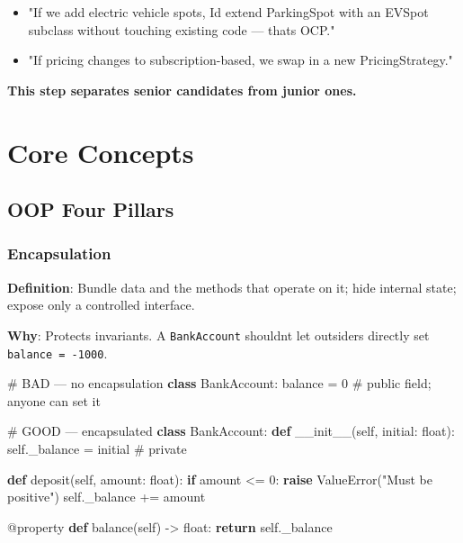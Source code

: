 \documentclass[11pt]{article}
\providecommand{\tightlist}{\setlength{\itemsep}{1pt}\setlength{\parskip}{0pt}}
\newenvironment{Shaded}{\begin{snugshade}}{\end{snugshade}}
\newcommand{\AttributeTok}[1]{\textcolor[rgb]{0.16,0.50,0.73}{#1}}
\newcommand{\BuiltInTok}[1]{\textcolor[rgb]{0.50,0.55,0.55}{#1}}
\newcommand{\CommentTok}[1]{\textcolor[rgb]{0.48,0.49,0.49}{#1}}
\newcommand{\ControlFlowTok}[1]{\textcolor[rgb]{0.99,0.74,0.29}{\textbf{#1}}}
\newcommand{\DecValTok}[1]{\textcolor[rgb]{0.96,0.45,0.00}{#1}}
\newcommand{\FunctionTok}[1]{\textcolor[rgb]{0.56,0.27,0.68}{#1}}
\newcommand{\KeywordTok}[1]{\textcolor[rgb]{0.81,0.81,0.76}{\textbf{#1}}}
\newcommand{\NormalTok}[1]{\textcolor[rgb]{0.81,0.81,0.76}{#1}}
\newcommand{\OperatorTok}[1]{\textcolor[rgb]{0.81,0.81,0.76}{#1}}
\newcommand{\PreprocessorTok}[1]{\textcolor[rgb]{0.15,0.68,0.38}{#1}}
\newcommand{\StringTok}[1]{\textcolor[rgb]{0.96,0.31,0.31}{#1}}
\newcommand{\VariableTok}[1]{\textcolor[rgb]{0.15,0.68,0.68}{#1}}
\begin{document}
\begin{itemize}
\tightlist
\item
  "If we add electric vehicle spots, I\textquotesingle d extend ParkingSpot with an EVSpot subclass without touching existing code --- that\textquotesingle s OCP."
\item
  "If pricing changes to subscription-based, we swap in a new PricingStrategy."
\end{itemize}

\textbf{This step separates senior candidates from junior ones.}

\section{Core Concepts}\label{core-concepts}

\subsection{OOP Four Pillars}\label{oop-four-pillars}

\subsubsection{Encapsulation}\label{encapsulation}

\textbf{Definition}: Bundle data and the methods that operate on it; hide internal state; expose only a controlled interface.

\textbf{Why}: Protects invariants. A \texttt{BankAccount} shouldn\textquotesingle t let outsiders directly set \texttt{balance\ =\ -1000}.


\begin{Shaded}
\begin{Highlighting}[]
\CommentTok{\# BAD — no encapsulation}
\KeywordTok{class}\NormalTok{ BankAccount:}
\NormalTok{    balance }\OperatorTok{=} \DecValTok{0}  \CommentTok{\# public field; anyone can set it}

\CommentTok{\# GOOD — encapsulated}
\KeywordTok{class}\NormalTok{ BankAccount:}
    \KeywordTok{def} \FunctionTok{\_\_init\_\_}\NormalTok{(}\VariableTok{self}\NormalTok{, initial: }\BuiltInTok{float}\NormalTok{):}
        \VariableTok{self}\NormalTok{.\_balance }\OperatorTok{=}\NormalTok{ initial  }\CommentTok{\# private}

    \KeywordTok{def}\NormalTok{ deposit(}\VariableTok{self}\NormalTok{, amount: }\BuiltInTok{float}\NormalTok{):}
        \ControlFlowTok{if}\NormalTok{ amount }\OperatorTok{\textless{}=} \DecValTok{0}\NormalTok{:}
            \ControlFlowTok{raise} \PreprocessorTok{ValueError}\NormalTok{(}\StringTok{"Must be positive"}\NormalTok{)}
        \VariableTok{self}\NormalTok{.\_balance }\OperatorTok{+=}\NormalTok{ amount}

    \AttributeTok{@property}
    \KeywordTok{def}\NormalTok{ balance(}\VariableTok{self}\NormalTok{) }\OperatorTok{{-}\textgreater{}} \BuiltInTok{float}\NormalTok{:}
        \ControlFlowTok{return} \VariableTok{self}\NormalTok{.\_balance}
\end{Highlighting}
\end{Shaded}
\end{document}
